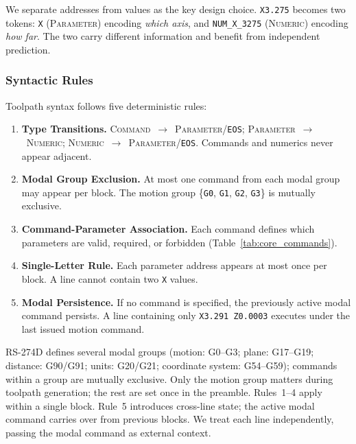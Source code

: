 \documentclass[sensors,article,submit,moreauthors,pdftex]{Definitions/mdpi}
\begin{document}
We separate addresses from values as the key design choice. \texttt{X3.275} becomes two tokens: \texttt{X} (\textsc{Parameter}) encoding \emph{which axis}, and \texttt{NUM\_X\_3275} (\textsc{Numeric}) encoding \emph{how far}. The two carry different information and benefit from independent prediction.

\subsubsection{Syntactic Rules}

Toolpath syntax follows five deterministic rules:

\begin{enumerate}[leftmargin=*]
    \item \textbf{Type Transitions.} \textsc{Command}~$\to$~\textsc{Parameter}/\texttt{EOS}; \textsc{Parameter}~$\to$~\textsc{Numeric}; \textsc{Numeric}~$\to$~\textsc{Parameter}/\texttt{EOS}. Commands and numerics never appear adjacent.

    \item \textbf{Modal Group Exclusion.} At most one command from each modal group may appear per block. The motion group \{\texttt{G0}, \texttt{G1}, \texttt{G2}, \texttt{G3}\} is mutually exclusive.

    \item \textbf{Command-Parameter Association.} Each command defines which parameters are valid, required, or forbidden (Table~\ref{tab:core_commands}).

    \item \textbf{Single-Letter Rule.} Each parameter address appears at most once per block. A line cannot contain two \texttt{X} values.

    \item \textbf{Modal Persistence.} If no command is specified, the previously active modal command persists. A line containing only \texttt{X3.291 Z0.0003} executes under the last issued motion command.
\end{enumerate}

RS-274D defines several modal groups (motion: G0--G3; plane: G17--G19; distance: G90/G91; units: G20/G21; coordinate system: G54--G59); commands within a group are mutually exclusive. Only the motion group matters during toolpath generation; the rest are set once in the preamble. Rules~1--4 apply within a single block. Rule~5 introduces cross-line state; the active modal command carries over from previous blocks. We treat each line independently, passing the modal command as external context.
\end{document}

